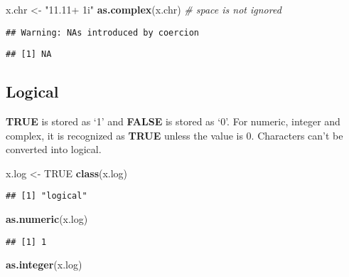 \documentclass[
  12pt,
]{article}
\newenvironment{Shaded}{\begin{snugshade}}{\end{snugshade}}
\newcommand{\CommentTok}[1]{\textcolor[rgb]{0.56,0.35,0.01}{\textit{#1}}}
\newcommand{\ConstantTok}[1]{\textcolor[rgb]{0.56,0.35,0.01}{#1}}
\newcommand{\FunctionTok}[1]{\textcolor[rgb]{0.13,0.29,0.53}{\textbf{#1}}}
\newcommand{\NormalTok}[1]{#1}
\newcommand{\OtherTok}[1]{\textcolor[rgb]{0.56,0.35,0.01}{#1}}
\newcommand{\StringTok}[1]{\textcolor[rgb]{0.31,0.60,0.02}{#1}}
\begin{document}
\begin{Shaded}
\begin{Highlighting}[]
\NormalTok{x.chr }\OtherTok{\textless{}{-}} \StringTok{"11.11+ 1i"}   
\FunctionTok{as.complex}\NormalTok{(x.chr)      }\CommentTok{\# space is not ignored}
\end{Highlighting}
\end{Shaded}

\begin{verbatim}
## Warning: NAs introduced by coercion
\end{verbatim}

\begin{verbatim}
## [1] NA
\end{verbatim}

\newpage
\subsection{Logical}
\label{sec:VAR-logical}

\textbf{TRUE} is stored as `1' and \textbf{FALSE} is stored as `0'. For
numeric, integer and complex, it is recognized as \textbf{TRUE} unless
the value is 0. Characters can't be converted into logical.

\begin{Shaded}
\begin{Highlighting}[]
\NormalTok{x.log }\OtherTok{\textless{}{-}} \ConstantTok{TRUE}
\FunctionTok{class}\NormalTok{(x.log)}
\end{Highlighting}
\end{Shaded}

\begin{verbatim}
## [1] "logical"
\end{verbatim}

\begin{Shaded}
\begin{Highlighting}[]
\FunctionTok{as.numeric}\NormalTok{(x.log)}
\end{Highlighting}
\end{Shaded}

\begin{verbatim}
## [1] 1
\end{verbatim}

\begin{Shaded}
\begin{Highlighting}[]
\FunctionTok{as.integer}\NormalTok{(x.log)}
\end{Highlighting}
\end{Shaded}
\end{document}
